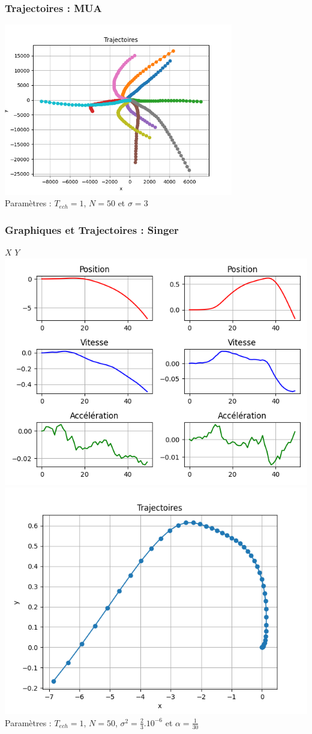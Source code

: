 \documentclass{beamer}
\begin{document}
\begin{frame}
  \frametitle{Trajectoires : MUA}
  \includegraphics[width=0.75\textwidth]{images/MUA_Trajectoires.png} \\
  Paramètres : $T_{ech} = 1$, $N = 50$ et $\sigma = 3$
\end{frame}

\begin{frame}
  \frametitle{Graphiques et Trajectoires : Singer}
  \hspace{1,4cm} $X$ \hspace{2,5cm} $Y$ \\
  \includegraphics[width=.5\textwidth]{images/SINGER_Générations_1.png}\hfill
  \includegraphics[width=.5\textwidth]{images/SINGER_Trajectoire_1.png} 
  Paramètres : $T_{ech} = 1$, $N = 50$, $\sigma^2 = \frac{2}{3}.10^{-6}$ et $\alpha = \frac{1}{30}$
\end{frame}
\end{document}
